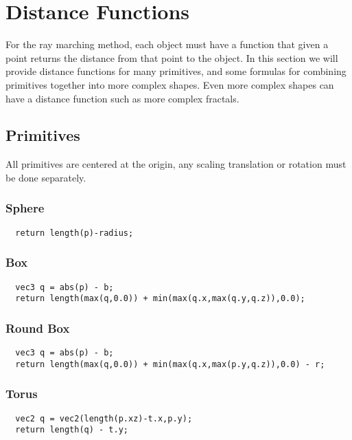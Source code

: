 \documentclass[../pbr.text]{subfile}
\begin{document}
\section{Distance Functions}%
\label{sec:distance_functions}

For the ray marching method, each object must have a function that given a
point returns the distance from that point to the object. In this section we
will provide distance functions for many primitives, and some formulas for
combining primitives together into more complex shapes. Even more complex
shapes can have a distance function such as more complex fractals.

\subsection{Primitives}%
\label{sub:primitives}

All primitives are centered at the origin, any scaling translation or rotation
must be done separately.

\subsubsection{Sphere}%
\label{ssub:sphere}
\begin{verbatim}
  return length(p)-radius;
\end{verbatim}

\subsubsection{Box}%
\label{ssub:box}
\begin{verbatim}
  vec3 q = abs(p) - b;
  return length(max(q,0.0)) + min(max(q.x,max(q.y,q.z)),0.0);
\end{verbatim}

\subsubsection{Round Box}%
\label{ssub:round_box}
\begin{verbatim}
  vec3 q = abs(p) - b;
  return length(max(q,0.0)) + min(max(q.x,max(p.y,q.z)),0.0) - r;
\end{verbatim}

\subsubsection{Torus}%
\label{ssub:torus}
\begin{verbatim}
  vec2 q = vec2(length(p.xz)-t.x,p.y);
  return length(q) - t.y;
\end{verbatim}
\end{document}
